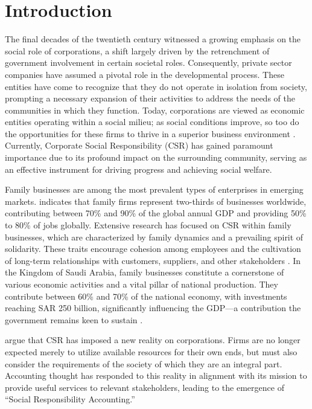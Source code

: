 \documentclass{NSP1}
\begin{document}
\section{Introduction}
The final decades of the twentieth century witnessed a growing emphasis on the social role of corporations, a shift largely driven by the retrenchment of government involvement in certain societal roles. Consequently, private sector companies have assumed a pivotal role in the developmental process. These entities have come to recognize that they do not operate in isolation from society, prompting a necessary expansion of their activities to address the needs of the communities in which they function. Today, corporations are viewed as economic entities operating within a social milieu; as social conditions improve, so too do the opportunities for these firms to thrive in a superior business environment \cite{ref1}. Currently, Corporate Social Responsibility (CSR) has gained paramount importance due to its profound impact on the surrounding community, serving as an effective instrument for driving progress and achieving social welfare.

Family businesses are among the most prevalent types of enterprises in emerging markets. \cite{ref8} indicates that family firms represent two-thirds of businesses worldwide, contributing between 70\% and 90\% of the global annual GDP and providing 50\% to 80\% of jobs globally. Extensive research has focused on CSR within family businesses, which are characterized by family dynamics and a prevailing spirit of solidarity. These traits encourage cohesion among employees and the cultivation of long-term relationships with customers, suppliers, and other stakeholders \cite{ref6}. In the Kingdom of Saudi Arabia, family businesses constitute a cornerstone of various economic activities and a vital pillar of national production. They contribute between 60\% and 70\% of the national economy, with investments reaching SAR 250 billion, significantly influencing the GDP---a contribution the government remains keen to sustain \cite{ref7}.

\cite{ref2} argue that CSR has imposed a new reality on corporations. Firms are no longer expected merely to utilize available resources for their own ends, but must also consider the requirements of the society of which they are an integral part. Accounting thought has responded to this reality in alignment with its mission to provide useful services to relevant stakeholders, leading to the emergence of ``Social Responsibility Accounting.''
\end{document}
